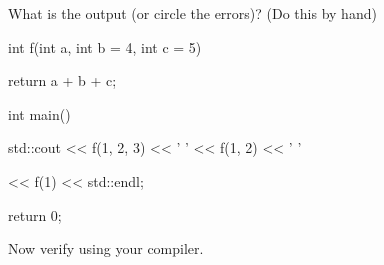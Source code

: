 What is the output (or circle the errors)? (Do this by hand)



\begin{consolethree}[escapeinside=||]

int f(int a, int b = 4, int c = 5)

{

    return a + b + c;

}



int main()

{

    std::cout << f(1, 2, 3) << ' ' << f(1, 2) << ' '

              << f(1) << std::endl;

    return 0;

}

\end{consolethree}



Now verify using your compiler.


